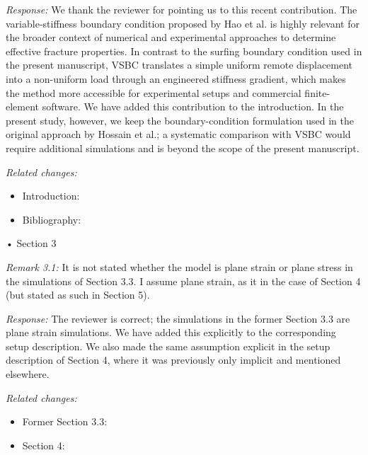 \documentclass[pdflatex,sn-mathphys-num]{sn-jnl}
\begin{document}
\emph{Response:} We thank the reviewer for pointing us to this recent contribution. The variable-stiffness boundary condition proposed by Hao et al. is highly relevant for the broader context of numerical and experimental approaches to determine effective fracture properties. In contrast to the surfing boundary condition used in the present manuscript, VSBC translates a simple uniform remote displacement into a non-uniform load through an engineered stiffness gradient, which makes the method more accessible for experimental setups and commercial finite-element software. We have added this contribution to the introduction. In the present study, however, we keep the boundary-condition formulation used in the original approach by Hossain et al.; a systematic comparison with VSBC would require additional simulations and is beyond the scope of the present manuscript.

\emph{Related changes:}
\begin{itemize}
\item Introduction: 
\item Bibliography: 
\end{itemize}

\bigskip

\noindent
• Section 3

\emph{Remark 3.1:} It is not stated whether the model is plane strain or plane stress in the simulations of Section 3.3. I assume plane strain, as it in the case of Section 4 (but stated as such in Section 5).

\emph{Response:} The reviewer is correct; the simulations in the former Section 3.3 are plane strain simulations. We have added this explicitly to the corresponding setup description. We also made the same assumption explicit in the setup description of Section 4, where it was previously only implicit and mentioned elsewhere.

\emph{Related changes:}
\begin{itemize}
\item Former Section 3.3: 
\item Section 4: 
\end{itemize}
\end{document}
